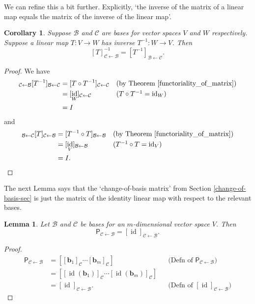 \documentclass[a4paper,11pt]{book}
\newtheorem{corollary}[theorem]{Corollary}
\newtheorem{lemma}[theorem]{Lemma}
\theoremstyle{definition}
\newcommand{\ve}[1]{\mathbf{#1}}
\newcommand{\mat}[1]{\mathsf{#1}}
\newcommand{\basis}[1]{{\mathcal #1}}
\DeclareMathOperator{\id}{id}
\begin{document}
We can refine this a bit further. Explicitly, `the inverse of the matrix of a linear map equals the matrix of the inverse of the linear map'.
\begin{corollary} \label{inverse-of-map-via-matrices} Suppose $\basis{B}$ and $\basis{C}$ are bases for vector spaces $V$ and $W$ respectively. Suppose a linear map $T : V \rightarrow W$ has inverse $T^{-1} : W \rightarrow V$. Then
\[
 [T]_{\basis{C} \leftarrow \basis{B}}^{-1} = [T^{-1}]_{\basis{B} \leftarrow \basis{C}}.
\]
\end{corollary}
\begin{proof}
We have
\begin{align*}
 [T]_{\basis{C} \leftarrow \basis{B}} [T^{-1}]_{\basis{B} \leftarrow \basis{C}} &= [T \circ T^{-1}]_{\basis{C} \leftarrow \basis{C}} && \mbox{(by Theorem \ref{functoriality_of_matrix})} \\
 &= [\id_W]_{\basis{C} \leftarrow \basis{C}} && \mbox{($T \circ T^{-1} = \id_W$)} \\
 &= I
\end{align*}
and
\begin{align*}
 [T^{-1}]_{\basis{B} \leftarrow \basis{C}} [T]_{\basis{C} \leftarrow \basis{B}} &= [T^{-1} \circ T]_{\basis{B} \leftarrow \basis{B}} && \mbox{(by Theorem \ref{functoriality_of_matrix})} \\
 &= [\id_V]_{\basis{B} \leftarrow \basis{B}} && \mbox{($T^{-1} \circ T = \id_V$)} \\
 &= I.
\end{align*}
\end{proof}

The next Lemma says that the `change-of-basis matrix' from Section \ref{change-of-basis-sec} is just the matrix of the identity linear map with respect to the relevant bases.

\begin{lemma} \label{change-of-basis-as-matrix}Let $\basis{B}$ and $\basis{C}$ be bases for an $m$-dimensional vector space $V$. Then
\[
\mat{P}_{\basis{C} \leftarrow \basis{B}} = [\id]_{\basis{C} \leftarrow \basis{B}}.
\]
\end{lemma}
\begin{proof} 
\begin{align*} 
\mat{P}_{\basis{C} \leftarrow \basis{B}} &= \left[ [\ve{b}_1]_{\basis{C}} \cdots [\ve{b}_m]_{\basis{C}} \right] && \mbox{(Defn of $\mat{P}_{\basis{C} \leftarrow \basis{B}}$)}  \\
&= \left[ [\id(\ve{b}_1)]_{\basis{C}} \cdots [\id(\ve{b}_m)]_{\basis{C}} \right] \\
&= [\id]_{\basis{C} \leftarrow \basis{B}}. && \mbox{(Defn of $[\id]_{\basis{C} \leftarrow \basis{B}}$)}
\end{align*}
\end{proof}
\end{document}

